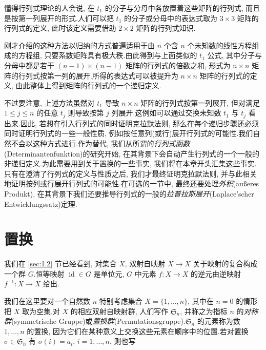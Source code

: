 懂得行列式理论的人会说, 在 $t_1$ 的分子与分母中各放置着这些矩阵的行列式, 而且是按第一列展开的形式.人们可以把 $t_1$ 的分子或分母中的表达式取为 $3 \times 3$ 矩阵的行列式的定义, 此时该定义需要借助 $2 \times 2$ 矩阵的行列式知识.

刚才介绍的这种方法以归纳的方式普遍适用于由 $n$ 个含 $n$ 个未知数的线性方程组成的方程组, 只要系数矩阵具有极大秩.由此得到与上面类似的 $t_1$ 公式, 其中分子与分母中都是若干 $(n - 1) \times (n - 1)$ 矩阵的行列式的倍数之和, 形式为 $n \times n$ 矩阵的行列式按第一列的展开.所得的表达式可以被提升为 $n \times n$ 矩阵的行列式的定义, 由此整体上得到矩阵的行列式的一个递归定义.

不过要注意, 上述方法虽然对 $t_1$ 导致 $n \times n$ 矩阵的行列式按第一列展开, 但对满足 $1 \leq j \leq n$ 的任意 $t_j$ 则导致按第 $j$ 列展开.这例如可以通过交换未知数 $t_1$ 与 $t_j$ 看出来.因此, 若想在引入行列式的同时证明克拉默法则, 那么在每个递归步骤还必须同时证明行列式的一些一般性质, 例如按任意列(或行)展开行列式的可能性.我们自然不会以这种方式进行.作为替代, 我们从所谓的\emph{行列式函数}(\textup{Determinantenfunktion})的研究开始, 在其背景下会自动产生行列式的一个一般的非递归定义.为此需要用到关于置换的一些事实, 我们将在本章开头汇集这些事实.只有在澄清了行列式的定义与性质之后, 我们才最终证明克拉默法则, 并与此相关地证明按列或行展开行列式的可能性.在可选的一节中, 最终还要处理\emph{外积}(\textup{äußeres Produkt}), 在其背景下我们还要推导行列式的一般的\emph{拉普拉斯展开}(\textup{Laplace'scher Entwicklungssatz})定理.

\section{置换}\label{sec:4.1}

我们在 \ref{sec:1.2} 节已经看到, 对集合 $X$, 双射自映射 $X \longrightarrow X$ 关于映射的复合构成一个群 $G$.恒等映射 $\operatorname{id} \in G$ 是单位元, $G$ 中元素 $f \colon X \longrightarrow X$ 的逆元由逆映射 $f^{-1} \colon X \longrightarrow X$ 给出.

我们在这里要对一个自然数 $n$ 特别考虑集合 $X = \{1, \ldots, n\}$, 其中在 $n = 0$ 的情形把 $X$ 取为空集.对 $X$ 的相应双射自映射群, 人们写作 $\mathfrak{S}_n$, 并称之为指标 $n$ 的\emph{对称群}(\textup{symmetrische Gruppe})或\emph{置换群}(\textup{Permutationsgruppe}).$\mathfrak{S}_n$ 的元素称为数 $1, \ldots, n$ 的置换, 因为它们在某种意义上交换这些元素在顺序中的位置.若对置换 $\sigma \in \mathfrak{S}_n$ 有 $\sigma(i) = a_i$, $i = 1, \ldots, n$, 则也写

